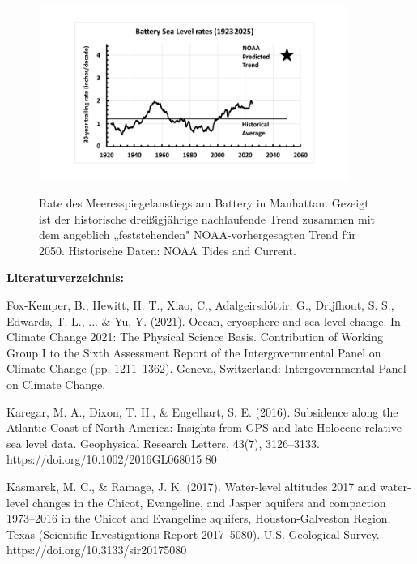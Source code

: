 \documentclass[12pt,paper=a4,DIV=12,parskip=never,chapterprefix=false,headings=standardclasses]{scrreprt}
\begin{document}
\begin{figure}[H]
\begin{center}
\includegraphics[width=0.9\textwidth]{bilder/bilderKlima-0073.png}\\[1cm]
\end{center}
\caption{Rate des Meeresspiegelanstiegs am Battery in Manhattan. Gezeigt ist der historische dreißigjährige nachlaufende Trend zusammen mit dem angeblich „feststehenden" NOAA-vorhergesagten Trend für 2050. Historische Daten: NOAA Tides and Current.}
\end{figure}

\vfill
\noindent\textbf{Literaturverzeichnis:}

\begingroup
\parindent=0pt
\everypar{\hangindent=2em\hangafter=1\relax}

Fox-Kemper, B., Hewitt, H. T., Xiao, C., Adalgeirsdóttir, G., Drijfhout, S. S., Edwards, T. L., ... \& Yu, Y.
(2021). Ocean, cryosphere and sea level change. In Climate Change 2021: The Physical Science
Basis. Contribution of Working Group I to the Sixth Assessment Report of the Intergovernmental
Panel on Climate Change (pp. 1211–1362). Geneva, Switzerland: Intergovernmental Panel on
Climate Change.

Karegar, M. A., Dixon, T. H., \& Engelhart, S. E. (2016). Subsidence along the Atlantic Coast of North
America: Insights from GPS and late Holocene relative sea level data. Geophysical Research Letters,
43(7), 3126–3133. https://doi.org/10.1002/2016GL068015
80

Kasmarek, M. C., \& Ramage, J. K. (2017). Water-level altitudes 2017 and water-level changes in the
Chicot, Evangeline, and Jasper aquifers and compaction 1973–2016 in the Chicot and Evangeline
aquifers, Houston-Galveston Region, Texas (Scientific Investigations Report 2017–5080). U.S.
Geological Survey. https://doi.org/10.3133/sir20175080
\end{document}
